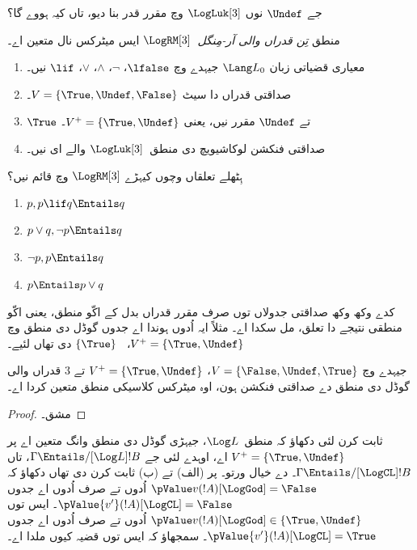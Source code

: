 \documentclass[../../../include/open-logic-section]{subfiles}
\begin{document}
جے $\Undef$ نوں $\LogLuk[3]$ وچ مقرر قدر بنا دیو، تاں کیہ ہووے گا؟

\begin{defn}
  منطق \emph{تِن قدراں والی آر-مِنگل}~$\LogRM[3]$ ایس میٹرکس نال متعین اے۔
  \begin{enumerate}
    \item معیاری قضیاتی زبان $\Lang L_0$ جیہدے وچ
    $\lfalse$، $\lnot$، $\land$، $\lor$، $\lif$ نیں۔
    \item صداقتی قدراں دا سیٹ $V = \{\True, \Undef, \False\}$۔
    \item $\True$ تے $\Undef$ مقرر نیں، یعنی $V^+ = \{\True, \Undef\}$۔
    \item صداقتی فنکشن لوکاشیویچ دی منطق~$\LogLuk[3]$ والے ای نیں۔
  \end{enumerate}
\end{defn}

\begin{prob}
  ہِٹھلے تعلقاں وچوں کیہڑے $\LogRM[3]$ وچ قائم نیں؟
  \begin{enumerate}
    \item $p, p \lif q \Entails q$
    \item $p \lor q, \lnot p \Entails q$
    \item $\lnot p, p \Entails q$
    \item $p \Entails p \lor q$
  \end{enumerate}
\end{prob}

کدے وکھ وکھ صداقتی جدولاں توں صرف مقرر قدراں بدل کے اکّو
منطق، یعنی اکّو منطقی نتیجے دا تعلق، مل سکدا اے۔ مثلاً ایہ
اُدوں ہوندا اے جدوں گوڈل دی منطق وچ $V^+ = \{\True,
\Undef\}$، ~$\{\True\}$ دی تھاں لئیے۔

\begin{prop}
  جیہدے وچ $V = \{\False, \Undef,\True\}$، $V^+=\{\True,
  \Undef\}$ تے $3$ قدراں والی گوڈل دی منطق دے صداقتی فنکشن
  ہون، اوہ میٹرکس کلاسیکی منطق متعین کردا اے۔
\end{prop}

\begin{proof}
  مشق۔
\end{proof}

\begin{prob}
   ثابت کرن لئی دکھاؤ
  کہ منطق~$\Log L$، جیہڑی گوڈل دی منطق وانگ متعین اے پر
  $V^+=\{\True,\Undef\}$ اے، اوہدے لئی جے $\Gamma \Entails/[\Log L] !B$،
  تاں $\Gamma \Entails/[\LogCL] !B$۔ 
  دے خیال ورتو۔ پر (الف) تے (ب) ثابت کرن دی تھاں دکھاؤ کہ
  $\pValue v(!A)[\LogGod] = \False$ اُدوں تے صرف اُدوں اے
  جدوں $\pValue {v'}(!A)[\LogCL] = \False$۔ ایس توں
  $\pValue
  v(!A)[\LogGod] \in \{\True,\Undef\}$ اُدوں تے صرف اُدوں اے
  جدوں $\pValue {v'}(!A)[\LogCL] =
  \True$۔ سمجھاؤ کہ ایس توں قضیہ کیوں ملدا اے۔
\end{prob}
\end{document}
